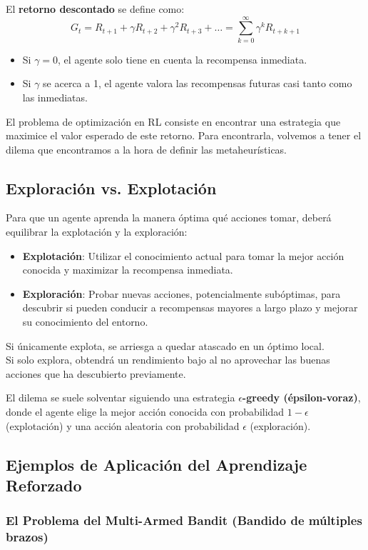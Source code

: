 \documentclass[12pt,a4paper]{book}
\begin{document}
El \textbf{retorno descontado} se define como:
\[ G_t = R_{t+1} + \gamma R_{t+2} + \gamma^2 R_{t+3} + \dots = \sum_{k=0}^{\infty} \gamma^k R_{t+k+1} \]

\begin{itemize}
    \item Si $\gamma = 0$, el agente solo tiene en cuenta la recompensa inmediata.
    \item Si $\gamma$ se acerca a 1, el agente valora las recompensas futuras casi tanto como las inmediatas.
\end{itemize}

El problema de optimización en RL consiste en encontrar una estrategia que maximice el valor esperado de este retorno. Para encontrarla, volvemos a tener el dilema que encontramos a la 
hora de definir las metaheurísticas.

\subsection{Exploración vs. Explotación}

Para que un agente aprenda la manera  óptima qué acciones tomar, deberá equilibrar la explotación y la exploración:
\begin{itemize}
    \item \textbf{Explotación}: Utilizar el conocimiento actual para tomar la mejor acción conocida y maximizar la recompensa inmediata.
    \item \textbf{Exploración}: Probar nuevas acciones, potencialmente subóptimas, para descubrir si pueden conducir a recompensas mayores a largo plazo y mejorar su conocimiento del entorno.
\end{itemize}
Si únicamente explota, se arriesga a quedar atascado en un óptimo local.\\
Si solo explora, obtendrá un rendimiento bajo al no aprovechar las buenas acciones que ha descubierto previamente.

El dilema se suele solventar siguiendo una estrategia \textbf{$\epsilon$-greedy (épsilon-voraz)}, donde el agente elige la mejor acción conocida con probabilidad $1-\epsilon$ (explotación) y una acción aleatoria con probabilidad $\epsilon$ (exploración).

\subsection{Ejemplos de Aplicación del Aprendizaje Reforzado}

\subsubsection{El Problema del Multi-Armed Bandit (Bandido de múltiples brazos)}
\end{document}
